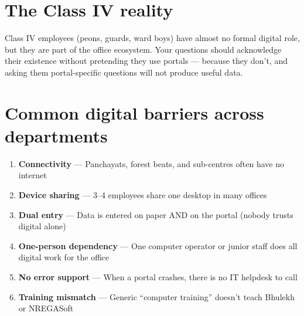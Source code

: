 \documentclass[11pt,a4paper]{article}
\begin{document}
\section{The Class IV reality}

Class IV employees (peons, guards, ward boys) have almost no formal digital role, but they are part of the office ecosystem. Your questions should acknowledge their existence without pretending they use portals --- because they don't, and asking them portal-specific questions will not produce useful data.

\section{Common digital barriers across departments}

\begin{enumerate}[nosep]
  \item \textbf{Connectivity} --- Panchayats, forest beats, and sub-centres often have no internet
  \item \textbf{Device sharing} --- 3--4 employees share one desktop in many offices
  \item \textbf{Dual entry} --- Data is entered on paper AND on the portal (nobody trusts digital alone)
  \item \textbf{One-person dependency} --- One computer operator or junior staff does all digital work for the office
  \item \textbf{No error support} --- When a portal crashes, there is no IT helpdesk to call
  \item \textbf{Training mismatch} --- Generic ``computer training'' doesn't teach Bhulekh or NREGASoft
\end{enumerate}
\end{document}

